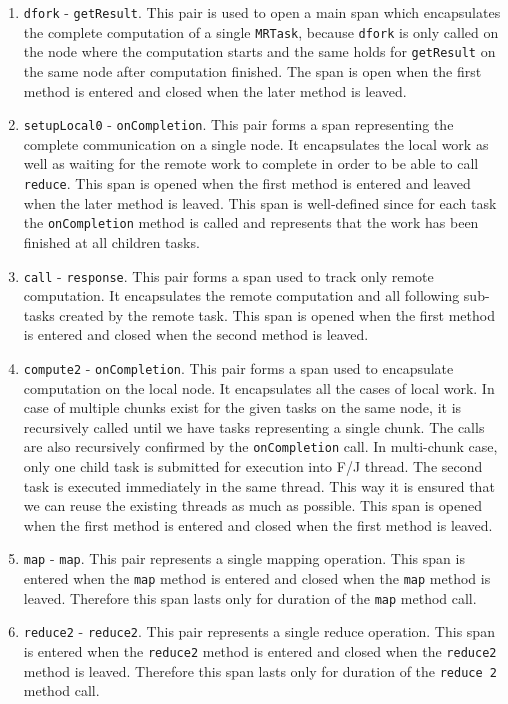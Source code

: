 \begin{enumerate}
	\item \texttt{dfork} - \texttt{getResult}. This pair is used to open a main span which encapsulates the complete computation of a single \texttt{MRTask}, because \texttt{dfork} is only called on the node where the computation starts and the same holds for \texttt{getResult} on the same node after computation finished. The span is open when the first method is entered and closed when the later method is leaved.
		
	\item \texttt{setupLocal0} - \texttt{onCompletion}. This pair forms a span representing the complete communication on a single node. It encapsulates the local work as well as waiting for the remote work to complete in order to be able to call \texttt{reduce}. This span is opened when the first method is entered and leaved when the later method is leaved. This span is well-defined since for each task the \texttt{onCompletion} method is called and represents that the work has been finished at all children tasks.
	
	\item \texttt{call} - \texttt{response}. This pair forms a span used to track only remote computation. It encapsulates the remote computation and all following sub-tasks created by the remote task. This span is opened when the first method is entered and closed when the second method is leaved.
	
	\item \texttt{compute2} - \texttt{onCompletion}. This pair forms a span used to encapsulate computation on the local node. It encapsulates all the cases of local work. In case of multiple chunks exist for the given tasks on the same node, it is recursively called until we have tasks representing a single chunk. The calls are also recursively confirmed by the \texttt{onCompletion} call. In multi-chunk case, only one child task is submitted for execution into F/J thread. The second task is executed immediately in the same thread. This way it is ensured that we can reuse the existing threads as much as possible. This span is opened when the first method is entered and closed when the first method is leaved.
	
	\item \texttt{map} - \texttt{map}. This pair represents a single mapping operation. This span is entered when the \texttt{map} method is entered and closed when the \texttt{map} method is leaved. Therefore this span lasts only for duration of the \texttt{map} method call.
	
	\item \texttt{reduce2} - \texttt{reduce2}. This pair represents a single reduce operation. This span is entered when the \texttt{reduce2} method is entered and closed when the \texttt{reduce2} method is leaved. Therefore this span lasts only for duration of the \texttt{reduce 2} method call.
\end{enumerate}

